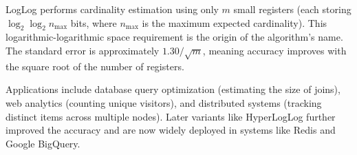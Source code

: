 LogLog performs cardinality estimation using only $m$ small registers (each storing $\log_2 \log_2 n_{\text{max}}$ bits, where $n_{\text{max}}$ is the maximum expected cardinality). This logarithmic-logarithmic space requirement is the origin of the algorithm's name. The standard error is approximately $1.30/\sqrt{m}$, meaning accuracy improves with the square root of the number of registers.

Applications include database query optimization (estimating the size of joins), web analytics (counting unique visitors), and distributed systems (tracking distinct items across multiple nodes). Later variants like HyperLogLog further improved the accuracy and are now widely deployed in systems like Redis and Google BigQuery.
